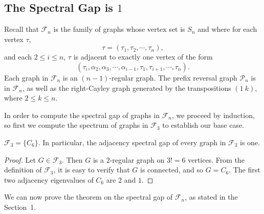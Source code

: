 

\subsection{The Spectral Gap is $1$}

Recall that $\mathcal{F}_n$ is the family of graphs whose vertex set is $S_n$ and
where for each vertex $\tau$,
\[ \tau = (\tau_1, \tau_2, \cdots, \tau_n), \]
and each $2 \leq i \leq n$, $\tau$ is adjacent to exactly one vertex of the form 
\[ (\tau_i, \alpha_2, \alpha_3, \cdots, \alpha_{i-1}, \tau_1, \tau_{i+1}, \cdots, \tau_n). \]
Each graph in $\mathcal{F}_n$ is an $(n-1)$-regular graph.  The prefix reversal graph $\mathcal{P}_n$
is in $\mathcal{F}_n$, as well as the right-Cayley graph generated by the transpositions $(1\ k)$,
where $2 \leq k \leq n$.


In order to compute the spectral gap of graphs in $\mathcal{F}_n$, we proceed
by induction, so first we compute the spectrum of graphs in $\mathcal{F}_3$ to 
establish our base case.  

\begin{lemma}\label{base_case}
  $\mathcal{F}_3 = \{ C_6 \}$.  In particular, the adjacency spectral gap of every graph in
  $\mathcal{F}_3$ is one.
\end{lemma}
\begin{proof}
  Let $G \in \mathcal{F}_3$.  Then $G$ is a $2$-regular graph on $3! = 6$ vertices.
  From the definition of $\mathcal{F}_3$, it is easy to verify that $G$ is connected,
  and so $G = C_6$.  The first two adjacency eigenvalues of $C_6$ are $2$ and $1$.
\end{proof}


We can now prove the  theorem on the spectral gap of ${\mathcal F}_n$, as stated in the Section~1.

